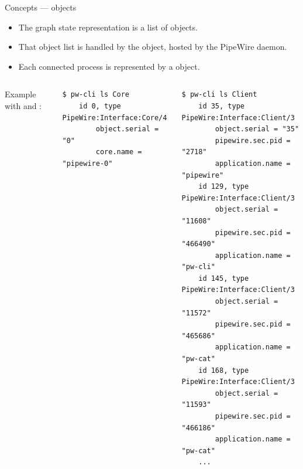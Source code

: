 \begin{frame}[fragile]{Concepts — objects}

  \begin{itemize}
  \item The graph state representation is a list of objects.
  \item That object list is handled by the  object, hosted
    by the PipeWire daemon.
  \item Each connected process is represented by a  object.
  \end{itemize}

  \begin{columns}

      Example with  and
      :

      \begin{block}{}
        \fontsize{8}{8}\selectfont
          \begin{verbatim}
$ pw-cli ls Core
    id 0, type PipeWire:Interface:Core/4
        object.serial = "0"
        core.name = "pipewire-0"
          \end{verbatim}
        \end{block}

      \begin{block}{}
        \fontsize{8}{8}\selectfont
          \begin{verbatim}
$ pw-cli ls Client
    id 35, type PipeWire:Interface:Client/3
        object.serial = "35"
        pipewire.sec.pid = "2718"
        application.name = "pipewire"
    id 129, type PipeWire:Interface:Client/3
        object.serial = "11608"
        pipewire.sec.pid = "466490"
        application.name = "pw-cli"
    id 145, type PipeWire:Interface:Client/3
        object.serial = "11572"
        pipewire.sec.pid = "465686"
        application.name = "pw-cat"
    id 168, type PipeWire:Interface:Client/3
        object.serial = "11593"
        pipewire.sec.pid = "466186"
        application.name = "pw-cat"
    ...
          \end{verbatim}
        \end{block}

  \end{columns}
\end{frame}



